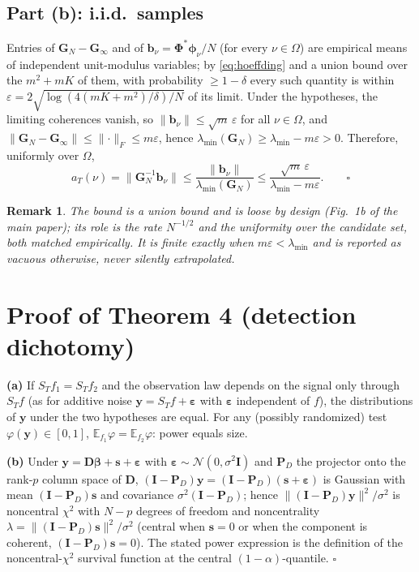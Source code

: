 \documentclass[10pt]{article}
\newtheorem{remark}{Remark}
\newcommand{\Phimat}{\bm{\Phi}}
\newcommand{\norm}[1]{\lVert#1\rVert}
\newcommand{\at}{a_T}
\begin{document}
\subsection{Part (b): i.i.d.\ samples}

Entries of $\bm G_N-\bm G_\infty$ and of $\bm b_\nu=\Phimat^{*}\bm\phi_\nu/N$ (for every
$\nu\in\Omega$) are empirical means of independent unit-modulus variables; by
\eqref{eq:hoeffding} and a union bound over the $m^2+mK$ of them, with probability
$\ge1-\delta$ every such quantity is within
$\varepsilon=2\sqrt{\log(4(mK+m^2)/\delta)/N}$ of its limit.  Under the hypotheses, the
limiting coherences vanish, so $\norm{\bm b_\nu}\le\sqrt m\,\varepsilon$ for all
$\nu\in\Omega$, and $\norm{\bm G_N-\bm G_\infty}\le\norm{\cdot}_F\le m\varepsilon$, hence
$\lambda_{\min}(\bm G_N)\ge\lambda_{\min}-m\varepsilon>0$.  Therefore, uniformly over
$\Omega$,
\[
\at(\nu)=\norm{\bm G_N^{-1}\bm b_\nu}
\le\frac{\norm{\bm b_\nu}}{\lambda_{\min}(\bm G_N)}
\le\frac{\sqrt m\,\varepsilon}{\lambda_{\min}-m\varepsilon}. \qquad\square
\]

\begin{remark}
The bound is a union bound and is loose by design (Fig.~1b of the main paper); its role
is the \emph{rate} $N^{-1/2}$ and the uniformity over the candidate set, both matched
empirically.  It is finite exactly when $m\varepsilon<\lambda_{\min}$ and is reported as
vacuous otherwise, never silently extrapolated.
\end{remark}

\section{Proof of Theorem 4 (detection dichotomy)}

\textbf{(a)}  If $S_Tf_1=S_Tf_2$ and the observation law depends on the signal only
through $S_Tf$ (as for additive noise $\bm y=S_Tf+\bm\varepsilon$ with
$\bm\varepsilon$ independent of $f$), the distributions of $\bm y$ under the two
hypotheses are equal.  For any (possibly randomized) test $\varphi(\bm y)\in[0,1]$,
$\mathbb E_{f_1}\varphi=\mathbb E_{f_2}\varphi$: power equals size.

\textbf{(b)}  Under $\bm y=\bm D\bm\beta+\bm s+\bm\varepsilon$ with
$\bm\varepsilon\sim\mathcal N(0,\sigma^2\bm I)$ and $\bm P_D$ the projector onto the
rank-$p$ column space of $\bm D$, $(\bm I-\bm P_D)\bm y=(\bm I-\bm P_D)(\bm
s+\bm\varepsilon)$ is Gaussian with mean $(\bm I-\bm P_D)\bm s$ and covariance
$\sigma^2(\bm I-\bm P_D)$; hence $\norm{(\bm I-\bm P_D)\bm y}^2/\sigma^2$ is noncentral
$\chi^2$ with $N-p$ degrees of freedom and noncentrality
$\lambda=\norm{(\bm I-\bm P_D)\bm s}^2/\sigma^2$ (central when $\bm s=0$ or when the
component is coherent, $(\bm I-\bm P_D)\bm s=0$).  The stated power expression is the
definition of the noncentral-$\chi^2$ survival function at the central
$(1{-}\alpha)$-quantile. \hfill$\square$
\end{document}
